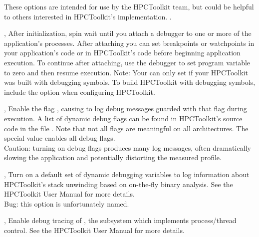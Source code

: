 \documentclass[english]{article}
\begin{document}
\begin{Description}

These options are intended for use by the HPCToolkit team,
but could be helpful to others interested in HPCToolkit's implementation.
.
 
\item[\Opt{-d}, \Opt{--debug}]
After initialization, spin wait until you attach a debugger
to one or more of the application's processes.
After attaching you can set breakpoints or watchpoints in your application's code
or in HPCToolkit’s  code before beginning application execution.
To continue after attaching, use the debugger to set program variable  to zero
and then resume execution.
Note: Your  can only set  if your HPCToolkit was built with debugging symbols.
To build HPCToolkit with debugging symbols,
include the option  when configuring HPCToolkit.

\item[\OptArg{-dd}{flag}, \OptArg{--dynamic-debug}{flag}]
Enable the flag ,
causing  to log debug messages guarded with that flag
during execution.
A list of dynamic debug flags can be found in HPCToolkit’s source code
in the file .
Note that not all flags are meaningful on all architectures.
The special value  enables all debug flags.
\\
Caution: turning on debug flags produces many log messages,
often dramatically slowing the application and potentially distorting the measured profile.

\item[\Opt{-q}, \Opt{--quiet}]
Turn on a default set of dynamic debugging vari\-ables to log information
about HPCToolkit’s stack unwinding based on on-the-fly binary analysis.
See the HPCToolkit User Manual for more details. \\
Bug: this option is unfortunately named.

\item[\Opt{-md}, \Opt{--monitor-debug}]
Enable debug tracing of , the  subsystem which implements process/thread control.
See the HPCToolkit User Manual for more details. 

\end{Description}


\end{document}
